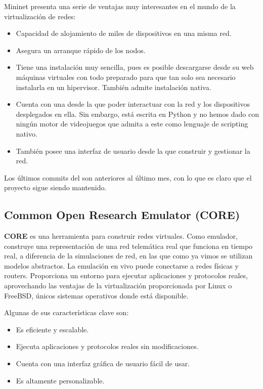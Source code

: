 Mininet presenta una serie de ventajas muy interesantes en el mundo de la virtualización de redes:
\begin{itemize}
\item Capacidad de alojamiento de miles de dispositivos en una misma red. 
\item Asegura un arranque rápido de los nodos.
\item Tiene una instalación muy sencilla, pues es posible descargarse desde su web máquinas virtuales con todo preparado para que tan solo sea necesario instalarla en un hipervisor. También admite instalación nativa.
\item Cuenta con una  desde la que poder interactuar con la red y los dispositivos desplegados en ella. Sin embargo, está escrita en Python y no hemos dado con ningún motor de videojuegos que admita a este como lenguaje de scripting nativo.
\item También posee una interfaz de usuario desde la que construir y gestionar la red.
\end{itemize}

Los últimos commits del  son anteriores al último mes, con lo que es claro que el proyecto sigue siendo mantenido.

\subsection{Common Open Research Emulator (CORE)}
\textbf{CORE} es una herramienta para construir redes virtuales. Como emulador, construye una representación de una red telemática real que funciona en tiempo real, a diferencia de la simulaciones de red, en las que como ya vimos se utilizan modelos abstractos.  La emulación en vivo puede conectarse a redes físicas y routers. Proporciona un entorno para ejecutar aplicaciones y protocolos reales, aprovechando las ventajas de la virtualización proporcionada por Linux o FreeBSD, únicos sistemas operativos donde está disponible. 

Algunas de sus características clave son:
\begin{itemize}
\item Es eficiente y escalable.
\item Ejecuta aplicaciones y protocolos reales sin modificaciones.
\item Cuenta con una interfaz gráfica de usuario fácil de usar.
\item Es altamente personalizable.
\end{itemize}

